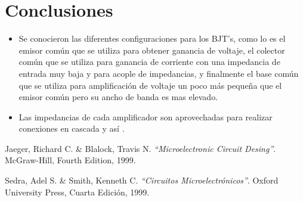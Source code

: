 \documentclass[10pt,graphicx,caption,rotating]{article}
\begin{document}
\section{Conclusiones}
\noindent
\begin{itemize}
 \item Se conocieron las diferentes configuraciones para los BJT's, como lo es el emisor común que se utiliza para obtener ganancia de voltaje, el colector común que se utiliza para ganancia de corriente con una impedancia de entrada muy baja y para acople de impedancias, y finalmente el base común que se utiliza para amplificación de voltaje un poco más pequeña que el emisor común pero su ancho de banda es mas elevado.
 \item Las impedancias de cada amplificador son aprovechadas para realizar conexiones en cascada y así .
\end{itemize}


\begin{thebibliography}{99}
 Jaeger, Richard C. \& Blalock, Travis N.
{\em "`Microelectronic Circuit Desing"'}.
McGraw-Hill, Fourth Edition, 1999.

 Sedra, Adel S. \& Smith, Kenneth C.
{\em "`Circuitos Microelectrónicos"'}.
Oxford University Press, Cuarta Edición, 1999.
\end{thebibliography}
\end{document}
